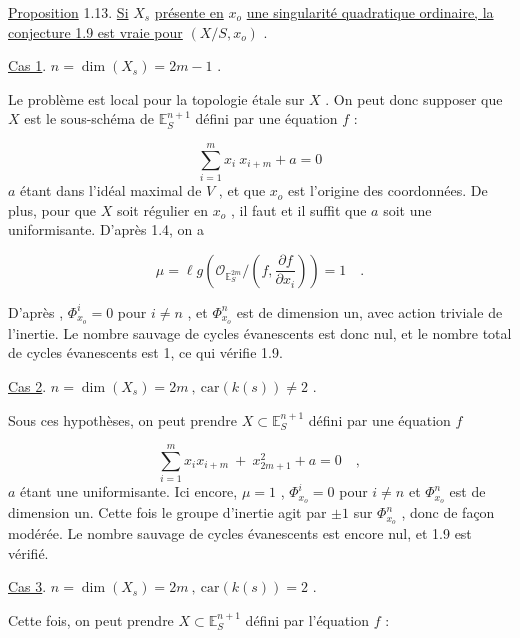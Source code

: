 \underline{Proposition} 1.13. \underline{Si} $X_s$ \underline{présente en} $x_o$ \underline{une singularité quadratique ordinaire, la conjecture 1.9 est vraie pour} $(X/S,x_o)$ .

\underline{Cas 1}. \quad \underline{$n = \dim(X_s) = 2m - 1$} .

Le problème est local pour la topologie étale sur $X$ . On peut donc supposer que $X$ est le sous-schéma de $\mathbb{E}_S^{n+1}$ défini par une équation $f$ :

\begin{equation*}
\sum_{i=1}^{m} x_i \ x_{i+m} + a = 0
\end{equation*}
$a$ étant dans l'idéal maximal de $V$ , et que $x_o$ est l'origine des coordonnées. De plus, pour que $X$ soit régulier en $x_o$ , il faut et il suffit que $a$ soit une uniformisante. D'après 1.4, on a

\begin{equation*}
\mu = \ell g(\mathcal{O}_{\mathbb{E}_S^{2m}} / (f, \frac{\partial f}{\partial x_i})) = 1 \quad .
\end{equation*}


D'après \hspace{2.5cm} , $\Phi^i_{x_o} = 0$ pour $i \neq n$ , et $\Phi^n_{x_o}$ est de dimension un, avec action triviale de l'inertie. Le nombre sauvage de cycles évanescents est donc nul, et le nombre total de cycles évanescents est 1, ce qui vérifie 1.9.

\underline{Cas 2}. \quad \underline{$n = \dim(X_s) = 2m \ , \ \mathrm{car}(k(s)) \neq 2$} .

Sous ces hypothèses, on peut prendre $X \subset \mathbb{E}_S^{n+1}$ défini par une équation $f$

\begin{equation*}
\sum_{i=1}^{m} x_ix_{i+m} \ + \ x_{2m+1}^2 + a = 0 \quad ,
\end{equation*}
$a$ étant une uniformisante. Ici encore, $\mu = 1$ , $\Phi^i_{x_o} = 0$ pour $i \neq n$ et $\Phi^n_{x_o}$ est de dimension un. Cette fois le groupe d'inertie agit par $\pm 1$ sur $\Phi^n_{x_o}$ , donc de façon modérée. Le nombre sauvage de cycles évanescents est encore nul, et 1.9 est vérifié.

\underline{Cas 3}. \quad \underline{$n = \dim(X_s) = 2m \ , \ \mathrm{car}(k(s)) = 2$} .

Cette fois, on peut prendre $X \subset \mathbb{E}_S^{n+1}$ défini par l'équation $f$ :

